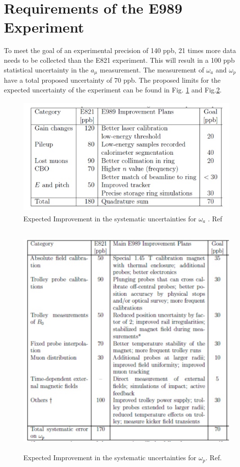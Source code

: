 \documentclass[./Thesis]{subfiles}
\begin{document}
\section{Requirements of the E989 Experiment}
	To meet the goal of an experimental precision of 140 ppb, 21 times more data needs to be collected than the E821 experiment. This will result in a 100 ppb statistical uncertainty in the $a_\mu$ measurement. The measurement of $\omega_a$ and $\omega_p$ have a total proposed uncertainty of 70 ppb. The proposed limits for the expected uncertainty of the experiment can be found in Fig. \ref{fig:wauncertainty} and Fig.\ref{fig:wpuncertainty}.

\begin{figure}
\centerline{\includegraphics[height=60mm]{wauncertainty.jpeg}}
\caption[Expected improvement of $\omega_a$ measurement in E989]{ Expected Improvement in the systematic uncertainties for $\omega_a$ . Ref \cite{TDR}
	}
\label{fig:wauncertainty}
\end{figure}

\begin{figure}
\centerline{\includegraphics[height=120mm]{wpuncertainty.jpeg}}
\caption[Expected improvement of $\omega_p$ measurement in E989]{ Expected Improvement in the systematic uncertainties for $\omega_p$. Ref. \cite{TDR}
	}
\label{fig:wpuncertainty}
\end{figure}
\end{document}
